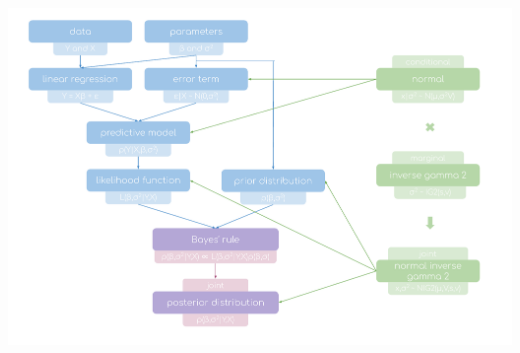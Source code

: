 \documentclass[notes,blackandwhite,mathsans]{beamer}
\begin{document}
%
%
%





\begin{frame}

\centering
\includegraphics[scale=0.45, trim= 1.8cm 2cm 2cm 0.5cm]{grphs/03conceptmap.pdf}

\end{frame}
\end{document}
